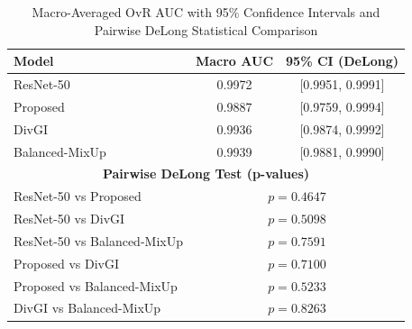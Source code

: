 \begin{table}[htbp]
\centering
\caption{Macro-Averaged OvR AUC with 95\% Confidence Intervals 
and Pairwise DeLong Statistical Comparison}
\label{tab:auc_delong_combined}
\small
\begin{tabular}{lcc}
\toprule
\textbf{Model} & \textbf{Macro AUC} & \textbf{95\% CI (DeLong)} \\
\midrule
ResNet-50      & 0.9972 & [0.9951, 0.9991] \\
Proposed       & 0.9887 & [0.9759, 0.9994] \\
DivGI          & 0.9936 & [0.9874, 0.9992] \\
Balanced-MixUp & 0.9939 & [0.9881, 0.9990] \\
\midrule
\multicolumn{3}{c}{\textbf{Pairwise DeLong Test (p-values)}} \\
\midrule
ResNet-50 vs Proposed & \multicolumn{2}{c}{$p = 0.4647$} \\
ResNet-50 vs DivGI & \multicolumn{2}{c}{$p = 0.5098$} \\
ResNet-50 vs Balanced-MixUp & \multicolumn{2}{c}{$p = 0.7591$} \\
Proposed vs DivGI & \multicolumn{2}{c}{$p = 0.7100$} \\
Proposed vs Balanced-MixUp & \multicolumn{2}{c}{$p = 0.5233$} \\
DivGI vs Balanced-MixUp & \multicolumn{2}{c}{$p = 0.8263$} \\
\bottomrule
\end{tabular}
\end{table}